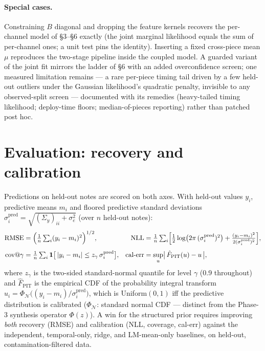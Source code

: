 \documentclass[11pt]{article}
\newcommand{\N}{\mathcal{N}}
\begin{document}
\paragraph{Special cases.} Constraining $B$ diagonal and dropping the feature
kernels recovers the per-channel model of \S3--\S6 exactly (the joint marginal
likelihood equals the sum of per-channel ones; a unit test pins the identity).
Inserting a fixed cross-piece mean $\mu$ reproduces the two-stage pipeline inside
the coupled model. A guarded variant of the joint fit mirrors the ladder of \S6
with an added overconfidence screen; one measured limitation remains --- a rare
per-piece timing tail driven by a few held-out outliers under the Gaussian
likelihood's quadratic penalty, invisible to any observed-split screen ---
documented with its remedies (heavy-tailed timing likelihood; deploy-time floors;
median-of-pieces reporting) rather than patched post hoc.

\section{Evaluation: recovery and calibration}

Predictions on held-out notes are scored on both axes. With held-out values $y_i$,
predictive means $m_i$ and floored predictive standard deviations
$\sigma_i^{\mathrm{pred}} = \sqrt{(\Sigma_y)_{ii} + \sigma_e^2}$
(over $n$ held-out notes):
\begin{align}
  \text{RMSE} &= \Bigl( \tfrac1n \textstyle\sum_i (y_i - m_i)^2 \Bigr)^{1/2},
  &
  \text{NLL} &= \tfrac1n \textstyle\sum_i \Bigl[ \tfrac12 \log\bigl(2\pi\, (\sigma_i^{\mathrm{pred}})^2\bigr)
        + \tfrac{(y_i - m_i)^2}{2 (\sigma_i^{\mathrm{pred}})^2} \Bigr],
  \\[4pt]
  \text{cov}@\gamma &= \tfrac1n \textstyle\sum_i \mathbf{1}\bigl[\, |y_i - m_i| \le z_{\gamma}\, \sigma_i^{\mathrm{pred}} \bigr],
  &
  \text{cal-err} &= \sup_u \bigl|\, \hat F_{\mathrm{PIT}}(u) - u \,\bigr|,
\end{align}
where $z_\gamma$ is the two-sided standard-normal quantile for level $\gamma$ (0.9
throughout) and $\hat F_{\mathrm{PIT}}$ is the empirical CDF of the probability integral
transform $u_i = \Phi_{\N}\bigl((y_i - m_i)/\sigma_i^{\mathrm{pred}}\bigr)$, which is
Uniform$(0,1)$ iff the predictive distribution is calibrated
($\Phi_{\N}$: standard normal CDF --- distinct from the Phase-3 synthesis operator
$\Phi(z)$). A win for the structured prior requires improving \emph{both} recovery (RMSE)
and calibration (NLL, coverage, cal-err) against the independent, temporal-only, ridge,
and LM-mean-only baselines, on held-out, contamination-filtered data.
\end{document}
